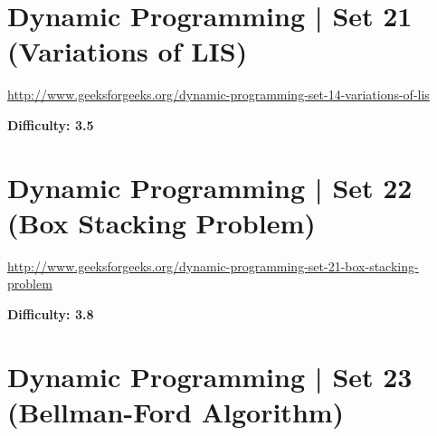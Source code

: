
\section{Dynamic Programming | Set 21 (Variations of LIS)
  \label{secGFGDPSet21VariationsOfLIS}}

\url{http://www.geeksforgeeks.org/dynamic-programming-set-14-variations-of-lis}

\textbf{Difficulty: 3.5}

\textbf{}

\RayNotesBegin



\RayNotesEnd

\textbf{}



\section{Dynamic Programming | Set 22 (Box Stacking Problem)
  \label{secGFGDPSet22BoxStackingProb}}

\url{http://www.geeksforgeeks.org/dynamic-programming-set-21-box-stacking-problem}

\textbf{Difficulty: 3.8}

\textbf{}

\RayNotesBegin



\RayNotesEnd

\textbf{}



\section{Dynamic Programming | Set 23 (Bellman-Ford Algorithm)
  \label{secGFGDPSet23BellmanFordAlgo}}

